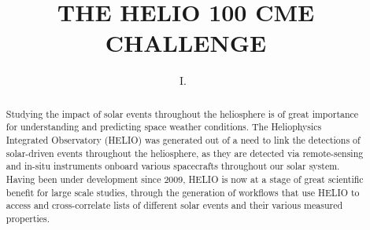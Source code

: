 \documentclass[namedreferences]{SolarPhysics}
\begin{document}
\begin{article}

\begin{opening}

\title{THE HELIO 100 CME CHALLENGE}

%
\author{I.~\surname{}%
       }

%


%


\begin{abstract}

Studying the impact of solar events throughout the heliosphere is of great importance for understanding and predicting space weather conditions. The Heliophysics Integrated Observatory (HELIO) was generated out of a need to link the detections of solar-driven events throughout the heliosphere, as they are detected via remote-sensing and in-situ instruments onboard various spacecrafts throughout our solar system.  Having been under development since 2009, HELIO is now at a stage of great scientific benefit for large scale studies, through the generation of workflows that use HELIO to access and cross-correlate lists of different solar events and their various measured properties.




\end{abstract}
\end{opening}
\end{article}
\end{document}
